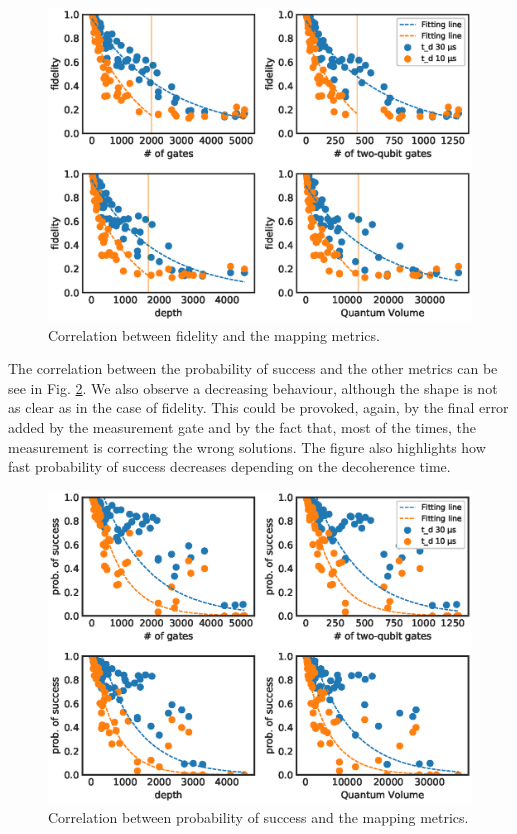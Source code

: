 \begin{figure}[htbp]
\centering
\includegraphics[width=\textwidth]{figures/f_metrics_correlation_poly.eps}
\caption{\label{fig:f_metrics_correlation}
Correlation between fidelity and the mapping metrics.}
\end{figure}

The correlation between the probability of success and the other metrics can be see in Fig. \ref{fig:ps_metrics_correlation}.
We also observe a decreasing behaviour, although the shape is not as clear as in the case of fidelity.
This could be provoked, again, by the final error added by the measurement gate and by the fact that, most of the times, the measurement is correcting the wrong solutions.
The figure also highlights how fast probability of success decreases depending on the decoherence time.

\begin{figure}[htbp]
\centering
\includegraphics[width=\textwidth]{figures/ps_metrics_correlation.eps}
\caption{\label{fig:ps_metrics_correlation}
Correlation between probability of success and the mapping metrics.}
\end{figure}


